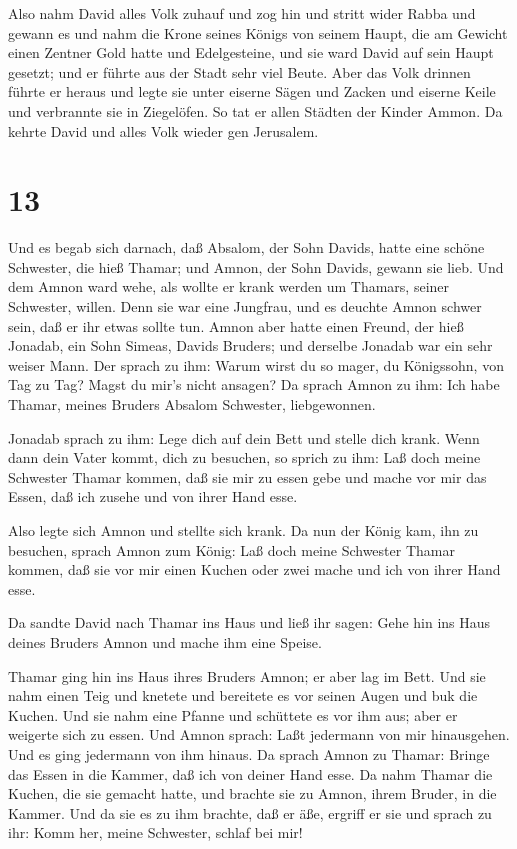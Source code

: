  Also nahm David alles Volk zuhauf und zog hin und stritt
wider Rabba und gewann es  und nahm die Krone seines Königs
von seinem Haupt, die am Gewicht einen Zentner Gold hatte und
Edelgesteine, und sie ward David auf sein Haupt gesetzt; und er führte
aus der Stadt sehr viel Beute.  Aber das Volk drinnen
führte er heraus und legte sie unter eiserne Sägen und Zacken und
eiserne Keile und verbrannte sie in Ziegelöfen. So tat er allen Städten
der Kinder Ammon. Da kehrte David und alles Volk wieder gen Jerusalem.

\hypertarget{section-12}{%
\section{13}\label{section-12}}

 Und es begab sich darnach, daß Absalom, der Sohn Davids,
hatte eine schöne Schwester, die hieß Thamar; und Amnon, der Sohn
Davids, gewann sie lieb.  Und dem Amnon ward wehe, als
wollte er krank werden um Thamars, seiner Schwester, willen. Denn sie
war eine Jungfrau, und es deuchte Amnon schwer sein, daß er ihr etwas
sollte tun.  Amnon aber hatte einen Freund, der hieß
Jonadab, ein Sohn Simeas, Davids Bruders; und derselbe Jonadab war ein
sehr weiser Mann.  Der sprach zu ihm: Warum wirst du so
mager, du Königssohn, von Tag zu Tag? Magst du mir's nicht ansagen? Da
sprach Amnon zu ihm: Ich habe Thamar, meines Bruders Absalom Schwester,
liebgewonnen.

 Jonadab sprach zu ihm: Lege dich auf dein Bett und stelle
dich krank. Wenn dann dein Vater kommt, dich zu besuchen, so sprich zu
ihm: Laß doch meine Schwester Thamar kommen, daß sie mir zu essen gebe
und mache vor mir das Essen, daß ich zusehe und von ihrer Hand esse.

 Also legte sich Amnon und stellte sich krank. Da nun der
König kam, ihn zu besuchen, sprach Amnon zum König: Laß doch meine
Schwester Thamar kommen, daß sie vor mir einen Kuchen oder zwei mache
und ich von ihrer Hand esse.

 Da sandte David nach Thamar ins Haus und ließ ihr sagen:
Gehe hin ins Haus deines Bruders Amnon und mache ihm eine Speise.

 Thamar ging hin ins Haus ihres Bruders Amnon; er aber lag
im Bett. Und sie nahm einen Teig und knetete und bereitete es vor seinen
Augen und buk die Kuchen.  Und sie nahm eine Pfanne und
schüttete es vor ihm aus; aber er weigerte sich zu essen. Und Amnon
sprach: Laßt jedermann von mir hinausgehen. Und es ging jedermann von
ihm hinaus.  Da sprach Amnon zu Thamar: Bringe das Essen in
die Kammer, daß ich von deiner Hand esse. Da nahm Thamar die Kuchen, die
sie gemacht hatte, und brachte sie zu Amnon, ihrem Bruder, in die
Kammer.  Und da sie es zu ihm brachte, daß er äße, ergriff
er sie und sprach zu ihr: Komm her, meine Schwester, schlaf bei mir!

